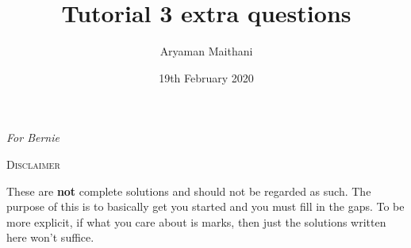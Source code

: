 \documentclass{article}
\title{Tutorial 3 extra questions}		%
\author{Aryaman Maithani}
\date{19th February 2020}				%
\begin{document}
\maketitle

\begin{center}
	\emph{For Bernie}
\end{center}

\hrulefill

\begin{center}
	\textsc{Disclaimer}
\end{center}
These are \textbf{not} complete solutions and should not be regarded as such. The purpose of this is to basically get you started and you must fill in the gaps. To be more explicit, if what you care about is marks, then just the solutions written here won't suffice.

\hrulefill
\end{document}
